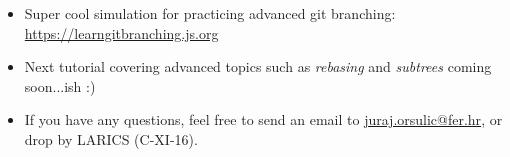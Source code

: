 \documentclass[xcolor=dvipsnames]{beamer}%
\begin{document}

\begin{frame}
	\begin{itemize}
     	\item Super cool simulation for practicing advanced git branching: \\ \href{https://learngitbranching.js.org} {https://learngitbranching.js.org}
     	\item Next tutorial covering advanced topics such as \emph{rebasing} and \emph{subtrees} coming soon...ish :)
	\item If you have any questions, feel free to send an email to 
	\href{mailto:juraj.orsulic@fer.hr}{juraj.orsulic@fer.hr}, or drop by LARICS (C-XI-16).
	\end{itemize}
\end{frame}

\end{document}
